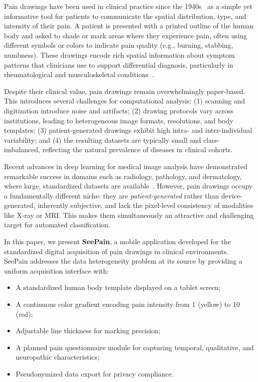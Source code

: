 \documentclass[conference]{IEEEtran}
\begin{document}
Pain drawings have been used in clinical practice since the 1940s~\cite{palmer1949} as a simple yet informative tool for patients to communicate the spatial distribution, type, and intensity of their pain. A patient is presented with a printed outline of the human body and asked to shade or mark areas where they experience pain, often using different symbols or colors to indicate pain quality (e.g., burning, stabbing, numbness). These drawings encode rich spatial information about symptom patterns that clinicians use to support differential diagnosis, particularly in rheumatological and musculoskeletal conditions~\cite{margolis1986}.

Despite their clinical value, pain drawings remain overwhelmingly paper-based. This introduces several challenges for computational analysis: (1) scanning and digitization introduce noise and artifacts; (2) drawing protocols vary across institutions, leading to heterogeneous image formats, resolutions, and body templates; (3) patient-generated drawings exhibit high intra- and inter-individual variability; and (4) the resulting datasets are typically small and class-imbalanced, reflecting the natural prevalence of diseases in clinical cohorts.

Recent advances in deep learning for medical image analysis have demonstrated remarkable success in domains such as radiology, pathology, and dermatology, where large, standardized datasets are available~\cite{litjens2017}. However, pain drawings occupy a fundamentally different niche: they are \emph{patient-generated} rather than device-generated, inherently subjective, and lack the pixel-level consistency of modalities like X-ray or MRI. This makes them simultaneously an attractive and challenging target for automated classification.

In this paper, we present \textbf{SeePain}, a mobile application developed for the standardized digital acquisition of pain drawings in clinical environments. SeePain addresses the data heterogeneity problem at its source by providing a uniform acquisition interface with:
\begin{itemize}
    \item A standardized human body template displayed on a tablet screen;
    \item A continuous color gradient encoding pain intensity from 1 (yellow) to 10 (red);
    \item Adjustable line thickness for marking precision;
    \item A planned pain questionnaire module for capturing temporal, qualitative, and neuropathic characteristics;
    \item Pseudonymized data export for privacy compliance.
\end{itemize}
\end{document}
